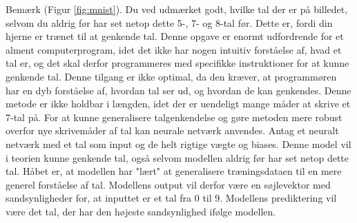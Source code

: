 \documentclass{article}
\newcommand{\figureref}[1]{(Figur \ref{#1})}
\begin{document}
Bemærk \figureref{fig:mnist}. Du ved udmærket godt, hvilke tal der er på billedet, selvom du aldrig før har set netop dette 5-, 7- og 8-tal før. Dette er, fordi din hjerne er trænet til at genkende tal. Denne opgave er enormt udfordrende for et alment computerprogram, idet det ikke har nogen intuitiv forståelse af, hvad et tal er, og det skal derfor programmeres med specifikke instruktioner for at kunne genkende tal. Denne tilgang er ikke optimal, da den kræver, at programmøren har en dyb forståelse af, hvordan tal ser ud, og hvordan de kan genkendes. Denne metode er ikke holdbar i længden, idet der er uendeligt mange måder at skrive et 7-tal på. For at kunne generalisere talgenkendelse og gøre metoden mere robust overfor nye skrivemåder af tal kan neurale netværk anvendes. Antag et neuralt netværk med et tal som input og de helt rigtige vægte og biases. Denne model vil i teorien kunne genkende tal, også selvom modellen aldrig før har set netop dette tal. Håbet er, at modellen har "lært" at generalisere træningsdataen til en mere generel forståelse af tal. Modellens output vil derfor være en søjlevektor med sandsynligheder for, at inputtet er et tal fra 0 til 9. Modellens prediktering vil være det tal, der har den højeste sandsynlighed ifølge modellen.
\clearpage
\end{document}
